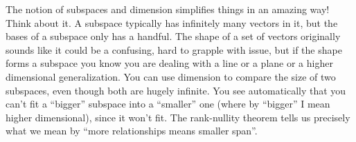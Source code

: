 The notion of subspaces and dimension simplifies things in an amazing way!
Think about it.
A subspace typically has infinitely many vectors in it, but the bases of a subspace only has a handful.
The shape of a set of vectors originally sounds like it could be a confusing, hard to grapple with issue, but if the shape forms a subspace you know you are dealing with a line or a plane or a higher dimensional generalization.  
You can use dimension to compare the size of two subspaces, even though both are hugely infinite.  
You see automatically that you can't fit a ``bigger'' subspace into a ``smaller'' one (where by ``bigger'' I mean higher dimensional), since it won't fit.  
The rank-nullity theorem tells us precisely what we mean by ``more relationships means smaller span''.

\exersisesl